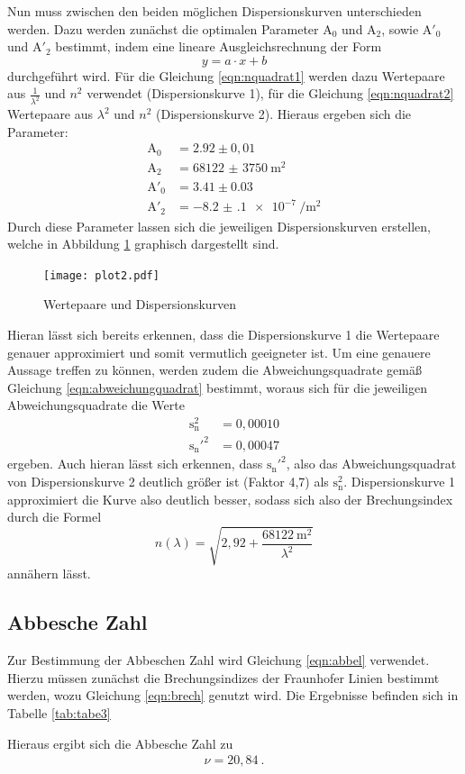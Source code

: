 Nun muss zwischen den beiden möglichen Dispersionskurven unterschieden werden.
Dazu werden zunächst die optimalen Parameter $\text{A}_0$ und $\text{A}_2$, sowie
$\text{A}'_0$ und $\text{A}'_2$
bestimmt, indem eine lineare Ausgleichsrechnung der Form
\begin{equation}
  y = a\cdot x +b
  \label{eqn:linear}
\end{equation}
durchgeführt wird. Für die Gleichung \ref{eqn:nquadrat1} werden dazu Wertepaare aus $\frac{1}{\lambda^2}$
und $n^2$ verwendet (Dispersionskurve 1), für die Gleichung \ref{eqn:nquadrat2} Wertepaare aus $\lambda^2$
und $n^2$ (Dispersionskurve 2).
Hieraus ergeben sich die Parameter:
\begin{align*}
  \text{A}_0 &= 2.92 \pm 0,01 \\
  \text{A}_2 &= \SI{68122(3750)}{\meter\squared} \\
  \text{A}'_0 &= 3.41 \pm 0.03 \\
  \text{A}'_2 &= \SI{-8.2(1)e-7}{\per\meter\squared}
\end{align*}
Durch diese Parameter lassen sich die jeweiligen Dispersionskurven erstellen, welche in Abbildung
\ref{fig:plot2} graphisch dargestellt sind.
\begin{figure}[H]
  \centering
  \texttt{[image: plot2.pdf]}
  \caption{Wertepaare und Dispersionskurven}
  \label{fig:plot2}
\end{figure}
Hieran lässt sich bereits erkennen, dass die Dispersionskurve 1 die Wertepaare genauer
approximiert und somit vermutlich geeigneter ist.
Um eine genauere Aussage treffen zu können, werden zudem die Abweichungsquadrate gemäß
Gleichung \ref{eqn:abweichungquadrat} bestimmt, woraus sich für die jeweiligen Abweichungsquadrate
die Werte
\begin{align*}
  \text{s}_{\text{n}}^2 &= 0,00010 \\
  \text{s}_{\text{n}}'^2 &= 0,00047
\end{align*}
ergeben.
Auch hieran lässt sich erkennen, dass $\text{s}_{\text{n}}'^2$, also das Abweichungsquadrat
von Dispersionskurve 2 deutlich größer ist (Faktor 4,7) als $\text{s}_{\text{n}}^2$.
Dispersionskurve 1 approximiert die Kurve also deutlich besser, sodass sich also
der Brechungsindex durch die Formel
\begin{equation}
  n(\lambda) = \sqrt{2,92 + \frac{\SI{68122}{\meter\squared}}{{\lambda}^2}}
  \label{eqn:brech}
\end{equation}
annähern lässt.

\subsection{Abbesche Zahl}
Zur Bestimmung der Abbeschen Zahl wird Gleichung \ref{eqn:abbel} verwendet.
Hierzu müssen zunächst die Brechungsindizes der Fraunhofer Linien bestimmt werden,
wozu Gleichung \ref{eqn:brech} genutzt wird. Die Ergebnisse befinden sich in Tabelle
\ref{tab:tabe3}

Hieraus ergibt sich die Abbesche Zahl zu
\begin{align}
  \nu = 20,84 \: .
\end{align}

